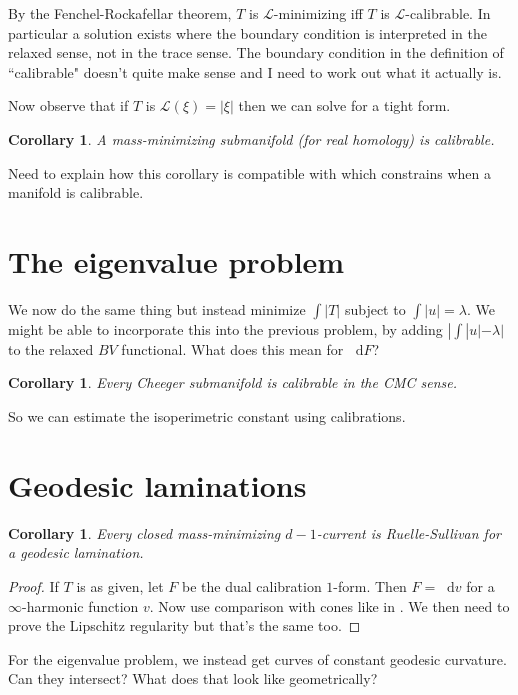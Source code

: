 \documentclass[reqno,11pt]{amsart}
\newcommand*\dif{\mathop{}\!\mathrm{d}}
\newcommand{\Lagrange}{\mathscr L}
\newtheorem{corollary}[theorem]{Corollary}
\theoremstyle{definition}
\numberwithin{equation}{section}
\begin{document}
By the Fenchel-Rockafellar theorem, $T$ is $\Lagrange$-minimizing iff $T$ is $\Lagrange$-calibrable.
In particular a solution exists where the boundary condition is interpreted in the relaxed sense, not in the trace sense.
The boundary condition in the definition of ``calibrable" doesn't quite make sense and I need to work out what it actually is.

Now observe that if $T$ is $\Lagrange(\xi) = |\xi|$ then we can solve for a tight form.

\begin{corollary}
A mass-minimizing submanifold (for real homology) is calibrable.
\end{corollary}

Need to explain how this corollary is compatible with \cite{liu2023homologically} which constrains when a manifold is calibrable.

\section{The eigenvalue problem}
We now do the same thing but instead minimize $\int |T|$ subject to $\int |u| = \lambda$.
We might be able to incorporate this into the previous problem, by adding $|\int|u| - \lambda|$ to the relaxed $BV$ functional.
What does this mean for $\dif F$?

\begin{corollary}
Every Cheeger submanifold is calibrable in the CMC sense.
\end{corollary}

So we can estimate the isoperimetric constant using calibrations.

\section{Geodesic laminations}
\begin{corollary}
    Every closed mass-minimizing $d - 1$-current is Ruelle-Sullivan for a geodesic lamination.
\end{corollary}
\begin{proof}
If $T$ is as given, let $F$ be the dual calibration $1$-form.
Then $F = \dif v$ for a $\infty$-harmonic function $v$.
Now use comparison with cones like in \cite{daskalopoulos2020transverse}.
We then need to prove the Lipschitz regularity but that's the same too.
\end{proof}

For the eigenvalue problem, we instead get curves of constant geodesic curvature. 
Can they intersect? What does that look like geometrically?
\end{document}
